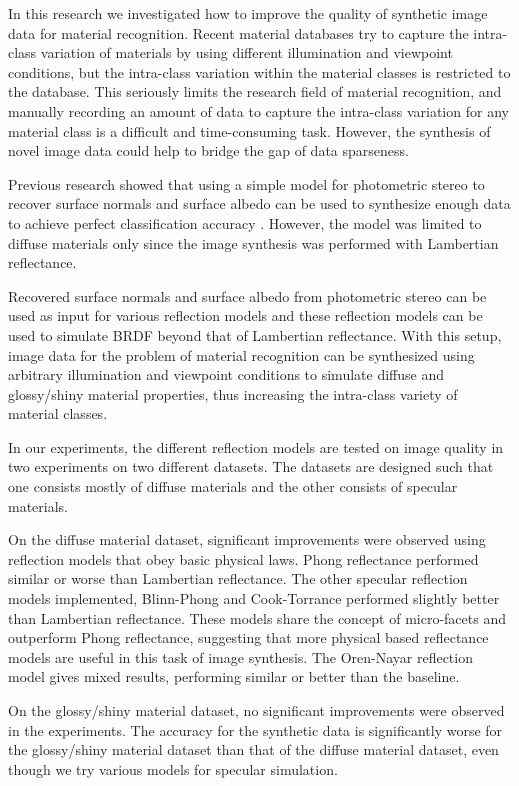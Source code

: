 \hypertarget{conclusion}{
}

In this research we investigated how to improve the quality of synthetic image data for material recognition. Recent material databases try to capture the intra-class variation of materials by using different illumination and viewpoint conditions, but the intra-class variation within the material classes is restricted to the database. This seriously limits the research field of material recognition, and manually recording an amount of data to capture the intra-class variation for any material class is a difficult and time-consuming task. However, the synthesis of novel image data could help to bridge the gap of data sparseness.

Previous research showed that using a simple model for photometric stereo to recover surface normals and surface albedo can be used to synthesize enough data to achieve perfect classification accuracy \cite{Targhi}. However, the model was limited to diffuse materials only since the image synthesis was performed with Lambertian reflectance. 

Recovered surface normals and surface albedo from photometric stereo can be used as input for various reflection models and these reflection models can be used to simulate BRDF beyond that of Lambertian reflectance. With this setup, image data for the problem of material recognition can be synthesized using arbitrary illumination and viewpoint conditions to simulate diffuse and glossy/shiny material properties, thus increasing the intra-class variety of material classes.

In our experiments, the different reflection models are tested on image quality in two experiments on two different datasets. The datasets are designed such that one consists mostly of diffuse materials and the other consists of specular materials. 

On the diffuse material dataset, significant improvements were observed using reflection models that obey basic physical laws. Phong reflectance performed similar or worse than Lambertian reflectance. The other specular reflection models implemented, Blinn-Phong and Cook-Torrance performed slightly better than Lambertian reflectance. These models share the concept of micro-facets and outperform Phong reflectance, suggesting that more physical based reflectance models are useful in this task of image synthesis. The Oren-Nayar reflection model gives mixed results, performing similar or better than the baseline.

On the glossy/shiny material dataset, no significant improvements were observed in the experiments. The accuracy for the synthetic data is significantly worse for the glossy/shiny material dataset than that of the diffuse material dataset, even though we try various models for specular simulation.

